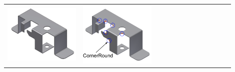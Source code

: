 \begin{minipage}[t]{\linewidth}
\begin{tabular}[!h]{@{} p{0.3\linewidth} | p{0.3\linewidth} | p{0.3\linewidth}@{}}
\includegraphics[width=0.98\linewidth]{..//Common/images/DefeatPhase_I_1} &
\includegraphics[width=0.98\linewidth]{..//Common/images/DefeatPhase_I_2_new_nolables.pdf} &

\end{tabular}
\end{minipage}
